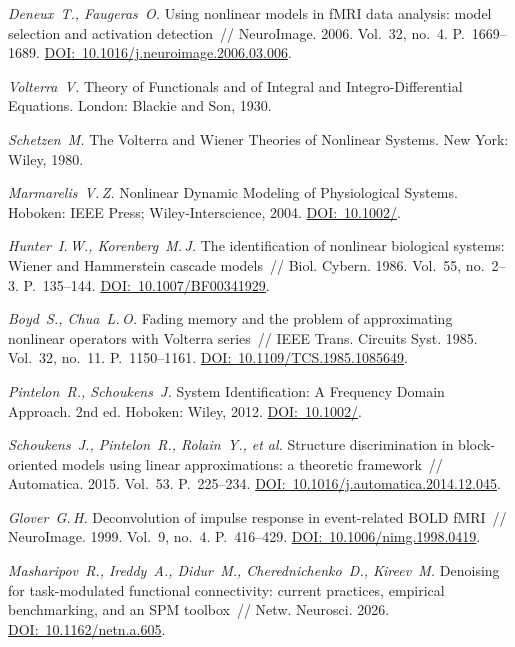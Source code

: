 \begin{ltrtr}
	\textit{Deneux~T., Faugeras~O.} Using nonlinear models in fMRI data analysis: model selection and activation detection~// NeuroImage. 2006. Vol.~32, no.~4. P.~1669--1689. \href{https://doi.org/10.1016/j.neuroimage.2006.03.006}{DOI:~10.1016/\allowbreak j.neuroimage.2006.03.006}.

	\textit{Volterra~V.} Theory of Functionals and of Integral and Integro-Differential Equations. London: Blackie and Son, 1930.

	\textit{Schetzen~M.} The Volterra and Wiener Theories of Nonlinear Systems. New York: Wiley, 1980.

	\textit{Marmarelis~V.\,Z.} Nonlinear Dynamic Modeling of Physiological Systems. Hoboken: IEEE Press; Wiley-Interscience, 2004. \href{https://doi.org/10.1002/9780471679370}{DOI:~10.1002/}.

	\textit{Hunter~I.\,W., Korenberg~M.\,J.} The identification of nonlinear biological systems: Wiener and Hammerstein cascade models~// Biol. Cybern. 1986. Vol.~55, no.~2--3. P.~135--144. \href{https://doi.org/10.1007/BF00341929}{DOI:~10.1007/\allowbreak BF00341929}.

	\textit{Boyd~S., Chua~L.\,O.} Fading memory and the problem of approximating nonlinear operators with Volterra series~// IEEE Trans. Circuits Syst. 1985. Vol.~32, no.~11. P.~1150--1161. \href{https://doi.org/10.1109/TCS.1985.1085649}{DOI:~10.1109/\allowbreak TCS.1985.1085649}.

	\textit{Pintelon~R., Schoukens~J.} System Identification: A Frequency Domain Approach. 2nd ed. Hoboken: Wiley, 2012. \href{https://doi.org/10.1002/9781118287422}{DOI:~10.1002/}.

	\textit{Schoukens~J., Pintelon~R., Rolain~Y., et al.} Structure discrimination in block-oriented models using linear approximations: a theoretic framework~// Automatica. 2015. Vol.~53. P.~225--234. \href{https://doi.org/10.1016/j.automatica.2014.12.045}{DOI:~10.1016/\allowbreak j.automatica.2014.12.045}.

	\textit{Glover~G.\,H.} Deconvolution of impulse response in event-related BOLD fMRI~// NeuroImage. 1999. Vol.~9, no.~4. P.~416--429. \href{https://doi.org/10.1006/nimg.1998.0419}{DOI:~10.1006/\allowbreak nimg.1998.0419}.

	\textit{Masharipov~R., Ireddy~A., Didur~M., Cherednichenko~D., Kireev~M.} Denoising for task-modulated functional connectivity: current practices, empirical benchmarking, and an SPM toolbox~// Netw. Neurosci. 2026. \href{https://doi.org/10.1162/netn.a.605}{DOI:~10.1162/\allowbreak netn.a.605}.

\end{ltrtr}
